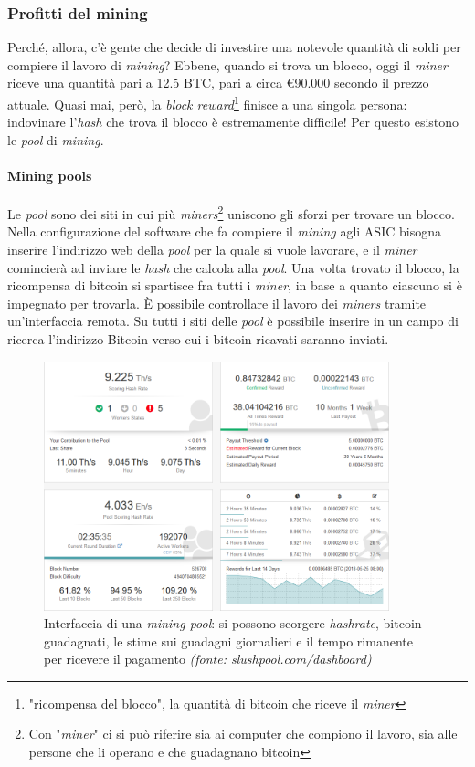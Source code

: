 \documentclass {article}
\begin{document}
\subsubsection {Profitti del mining}

Perché, allora, c'è gente che decide di investire una notevole quantità di soldi per compiere il lavoro di \textit{mining}?
Ebbene, quando si trova un blocco, oggi il \textit{miner} riceve una quantità pari a 12.5 BTC, pari a circa \euro{90.000} secondo il prezzo attuale.
Quasi mai, però, la \textit{block reward}\footnote{"ricompensa del blocco", la quantità di bitcoin che riceve il \textit{miner}} finisce a una singola persona: indovinare l'\textit{hash} che trova il blocco è estremamente difficile!
Per questo esistono le \textit{pool} di \textit{mining}.

\paragraph {Mining pools}

Le \textit{pool} sono dei siti in cui più \textit{miners}\footnote{Con "\textit{miner}" ci si può riferire sia ai computer che compiono il lavoro, sia alle persone che li operano e che guadagnano bitcoin} uniscono gli sforzi per trovare un blocco.
Nella configurazione del software che fa compiere il \textit{mining} agli ASIC bisogna inserire l'indirizzo web della \textit{pool} per la quale si vuole lavorare, e il \textit{miner} comincierà ad inviare le \textit{hash} che calcola alla \textit{pool}.
Una volta trovato il blocco, la ricompensa di bitcoin si spartisce fra tutti i \textit{miner}, in base a quanto ciascuno si è impegnato per trovarla.
È possibile controllare il lavoro dei \textit{miners} tramite un'interfaccia remota. Su tutti i siti delle \textit{pool} è possibile inserire in un campo di ricerca l'indirizzo Bitcoin verso cui i bitcoin ricavati saranno inviati.

\vspace {0.5cm}
\begin{figure}[htb!]
\includegraphics [width = 10cm] {dashboard.png}
\centering
\caption {Interfaccia di una \textit{mining pool}: si possono scorgere \textit{hashrate}, bitcoin guadagnati, le stime sui guadagni giornalieri e il tempo rimanente per ricevere il pagamento \textit{(fonte: slushpool.com/dashboard)}}
\end{figure}
\vspace {0.2cm}
\end{document}
